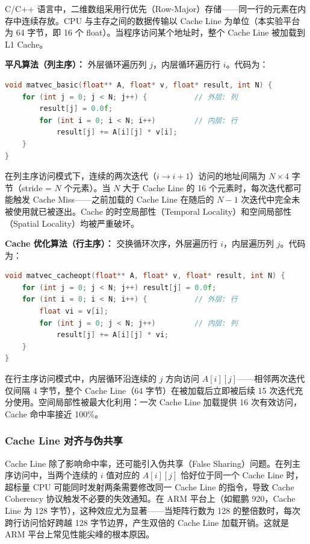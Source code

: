 \documentclass[a4paper]{article}
\begin{document}
C/C++ 语言中，二维数组采用行优先（Row-Major）存储——同一行的元素在内存中连续存放。CPU 与主存之间的数据传输以 Cache Line 为单位（本实验平台为 64 字节，即 16 个 float）。当程序访问某个地址时，整个 Cache Line 被加载到 L1 Cache。

\textbf{平凡算法（列主序）：} 外层循环遍历列 $j$，内层循环遍历行 $i$。代码为：

\begin{lstlisting}[title=平凡算法（列主序，非 Cache 友好）,frame=trbl,language={C++}]
void matvec_basic(float** A, float* v, float* result, int N) {
    for (int j = 0; j < N; j++) {           // 外层: 列
        result[j] = 0.0f;
        for (int i = 0; i < N; i++)         // 内层: 行
            result[j] += A[i][j] * v[i];
    }
}
\end{lstlisting}

在列主序访问模式下，连续的两次迭代（$i \rightarrow i+1$）访问的地址间隔为 $N \times 4$ 字节（stride = $N$ 个元素）。当 $N$ 大于 Cache Line 的 16 个元素时，每次迭代都可能触发 Cache Miss——之前加载的 Cache Line 在随后的 $N-1$ 次迭代中完全未被使用就已被逐出。Cache 的时空局部性（Temporal Locality）和空间局部性（Spatial Locality）均被严重破坏。

\textbf{Cache 优化算法（行主序）：} 交换循环次序，外层遍历行 $i$，内层遍历列 $j$。代码为：

\begin{lstlisting}[title=Cache优化算法（行主序，Cache 友好）,frame=trbl,language={C++}]
void matvec_cacheopt(float** A, float* v, float* result, int N) {
    for (int j = 0; j < N; j++) result[j] = 0.0f;
    for (int i = 0; i < N; i++) {           // 外层: 行
        float vi = v[i];
        for (int j = 0; j < N; j++)         // 内层: 列
            result[j] += A[i][j] * vi;
    }
}
\end{lstlisting}

在行主序访问模式中，内层循环沿连续的 $j$ 方向访问 $A[i][j]$——相邻两次迭代仅间隔 4 字节，整个 Cache Line（64 字节）在被加载后立即被后续 15 次迭代充分使用。空间局部性被最大化利用：一次 Cache Line 加载提供 16 次有效访问，Cache 命中率接近 100\%。

\subsubsection{Cache Line 对齐与伪共享}

Cache Line 除了影响命中率，还可能引入伪共享（False Sharing）问题。在列主序访问中，当两个连续的 $i$ 值对应的 $A[i][j]$ 恰好位于同一个 Cache Line 时，超标量 CPU 可能同时发射两条需要修改同一 Cache Line 的指令，导致 Cache Coherency 协议触发不必要的失效通知。在 ARM 平台上（如鲲鹏 920，Cache Line 为 128 字节），这种效应尤为显著——当矩阵行数为 128 的整倍数时，每次跨行访问恰好跨越 128 字节边界，产生双倍的 Cache Line 加载开销。这就是 ARM 平台上常见性能尖峰的根本原因。
\end{document}
